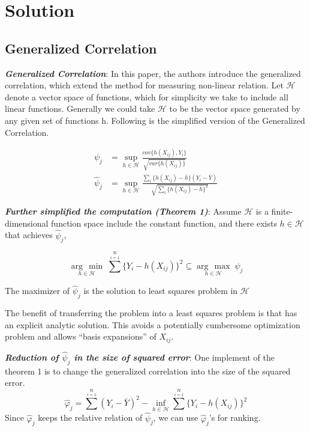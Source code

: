 \documentclass[paper=a4, fontsize=12pt]{scrartcl}
\numberwithin{equation}{section}
\numberwithin{figure}{section}
\numberwithin{table}{section}
\newcommand{\argmax}[1]{\underset{#1}{\operatorname{arg}\,\operatorname{max}}\;}
\newcommand{\argmin}[1]{\underset{#1}{\operatorname{arg}\,\operatorname{min}}\;}
\begin{document}
 
\section{Solution}
\subsection{Generalized Correlation}

\textit{\textbf{Generalized Correlation}}: In this paper, the authors introduce the generalized correlation, which extend the method for measuring non-linear relation. Let $\mathcal{H}$ denote a vector space of functions, which for simplicity we take to include all linear functions. Generally we could take $\mathcal{H}$ to be the vector space generated by any given set of functions h. Following is the simplified version of the Generalized Correlation. 

\begin{align*} 
      \psi_j &= \sup\limits_{h \in \mathcal{H}} \frac{cov\{h(X_{ij}), Y_i\}}{\sqrt{var\{h(X_{ij})\}}} \\   
      \hat{\psi}_j &= \sup\limits_{h \in \mathcal{H}} \frac{\sum_i\{h(X_{ij}) - \bar{h}\}(Y_i - \bar{Y})}{\sqrt{\sum_i \{h(X_{ij})-\bar{h}\}^2}}
\end{align*}


\textit{\textbf{Further simplified the computation (Theorem 1)}}: Assume $\mathcal{H}$ is a finite-dimensional function space include the constant function, and there exists $ h\in\mathcal{H}$ that achieves $\hat{\psi}_j$,

\[
\argmin{h \in \mathcal{H}} \sum^n\limits_{i = 1}\{Y_i - h(X_{ij})\}^2 \subseteq \argmax{h \in \mathcal{H}} \hat{\psi}_j
\]

The maximizer of $\hat{\psi}_j$ is the solution to least squares problem in $\mathcal{H}$

The benefit of transferring the problem into a least squares problem is that has an explicit analytic solution. This avoids a potentially cumbersome optimization problem and allows “basis expansions” of $X_{ij}$.

\textit{\textbf{Reduction of $\hat{\psi}_j$ in the size of squared error}}:
One implement of the theorem 1 is to change the generalized correlation into the size of the squared error.
\[
  \hat{\varphi}_j = \sum^n\limits_{i = 1} (Y_i - \bar{Y})^2 - \inf\limits_{h \in \mathcal{H}}\sum^n\limits_{i = 1}\{Y_i - h(X_{ij})\}^2
\]
Since $\hat{\varphi}_j$ keeps the relative relation of $\hat{\psi}_j$, we can use $\hat{\varphi}_j$'s for ranking.
\end{document}
